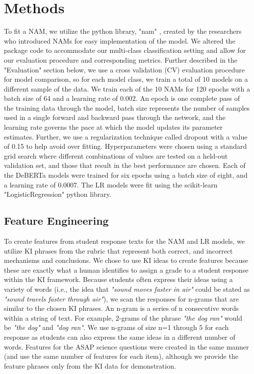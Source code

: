 \section{Methods}
To fit a NAM, we utilize the python library, "nam" \cite{kayid2020nams}, created by the researchers who introduced NAMs for easy implementation of the model. We altered the package code to accommodate our multi-class classification setting and allow for our evaluation procedure and corresponding metrics. Further described in the "Evaluation" section below, we use a cross validation (CV) evaluation procedure for model comparison, so for each model class, we train a total of 10 models on a different sample of the data. We train each of the 10 NAMs for 120 epochs with a batch size of 64 and a learning rate of 0.002. An epoch is one complete pass of the training data through the model, batch size represents the number of samples used in a single forward and backward pass through the network, and the learning rate governs the pace at which the model updates its parameter estimates. Further, we use a regularization technique called dropout with a value of 0.15 to help avoid over fitting. Hyperparameters were chosen using a standard grid search where different combinations of values are tested on a held-out validation set, and those that result in the best performance are chosen. Each of the DeBERTa models were trained for six epochs using a batch size of eight, and a learning rate of 0.0007. The LR models were fit using the scikit-learn "LogisticRegression" python library. 

\subsection{Feature Engineering}
To create features from student response texts for the NAM and LR models, we utilize KI phrases from the rubric that represent both correct, and incorrect mechanisms and conclusions. We chose to use KI ideas to create features because these are exactly what a human identifies to assign a grade to a student response within the KI framework. Because students often express their ideas using a variety of words (i.e., the idea that \textit{"sound moves faster in air"} could be stated as \textit{"sound travels faster through air"}), we scan the responses for n-grams that are similar to the chosen KI phrases. An n-gram is a series of n consecutive words within a string of text. For example, 2-grams of the phrase \textit{"the dog ran"} would be \textit{"the dog"} and \textit{"dog ran"}. We use n-grams of size n=1 through 5 for each response as students can also express the same ideas in a different number of words. Features for the ASAP science questions were created in the same manner (and use the same number of features for each item), although we provide the feature phrases only from the KI data for demonstration.

